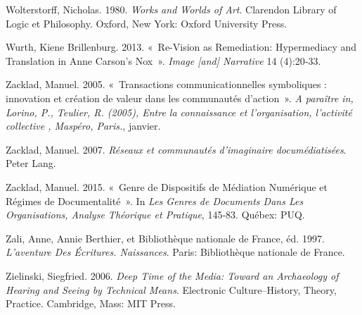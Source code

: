 \begin{CSLReferences}{1}{0}
\leavevmode{}%
Wolterstorff, Nicholas. 1980. \emph{Works and {Worlds} of {Art}}.
Clarendon {Library} of {Logic} et {Philosophy}. {Oxford, New York}:
{Oxford University Press}.

\leavevmode{}%
Wurth, Kiene Brillenburg. 2013. {«~Re-{Vision} as {Remediation}:
{Hypermediacy} and {Translation} in {Anne Carson}'s {Nox}~»}.
\emph{Image {[}and{]} Narrative} 14 (4):20‑33.

\leavevmode{}%
Zacklad, Manuel. 2005. {«~{Transactions communicationnelles symboliques
: innovation et cr{é}ation de valeur dans les communaut{é}s
d'action}~»}. \emph{A para{î}tre in, Lorino, P., Teulier, R. (2005),
{\guillemotleft} Entre la connaissance et l'organisation, l'activit{é}
collective {\guillemotright}, Masp{é}ro, Paris.}, janvier.

\leavevmode{}%
Zacklad, Manuel. 2007. \emph{{R{é}seaux et communaut{é}s d'imaginaire
docum{é}diatis{é}es}}. {Peter Lang}.

\leavevmode{}%
Zacklad, Manuel. 2015. {«~Genre de Dispositifs de M{é}diation
Num{é}rique et R{é}gimes de Documentalit{é}~»}. In \emph{Les Genres de
Documents Dans Les Organisations, {Analyse} Th{é}orique et Pratique},
145‑83. {Qu{é}bex}: {PUQ}.

\leavevmode{}%
Zali, Anne, Annie Berthier, et Bibliothèque nationale de France, éd.
1997. \emph{L'aventure Des {É}critures. {Naissances}}. {Paris}:
{Biblioth{è}que nationale de France}.

\leavevmode{}%
Zielinski, Siegfried. 2006. \emph{Deep {Time} of the {Media}: {Toward}
an {Archaeology} of {Hearing} and {Seeing} by {Technical Means}}.
Electronic Culture--History, Theory, Practice. {Cambridge, Mass}: {MIT
Press}.

\end{CSLReferences}
